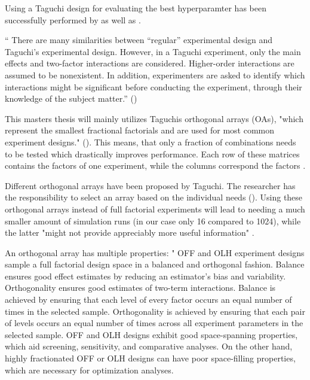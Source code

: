 
Using a Taguchi design for evaluating the best hyperparamter has been successfully performed by \cite{dao_maximising_2016} as well as \cite{assistant_professor_amity_university_jaipur_rajasthan_india_parameter_2019}. 

\enquote{ There are many similarities between “regular” experimental design and Taguchi's experimental design. However, in a Taguchi experiment, only the main effects and two-factor interactions are considered. Higher-order interactions are assumed to be nonexistent. In addition, experimenters are asked to identify which interactions might be significant before conducting the experiment, through their knowledge of the subject matter.} (\cite{yang_design_2009})

This masters thesis will mainly utilizes Taguchis orthogonal arrays (OAs), "which represent the smallest fractional factorials and are used for most common experiment designs." (\cite{roy_primer_1990}). This means, that only a fraction of combinations needs to be tested which drastically improves performance. Each row of these matrices contains the factors of one experiment, while the columns correspond the factors \cite{li_taguchi_2021}. 

Different orthogonal arrays have been proposed by Taguchi. The researcher has the responsibility to select an array based on the individual needs (\cite{li_taguchi_2021}).
Using these orthogonal arrays instead of full factorial experiments will lead to needing a much smaller amount of simulation runs (in our case only 16 compared to 1024), while the latter "might not provide appreciably more useful information" \cite{roy_primer_1990}.


An orthogonal array has multiple properties:
"
OFF and OLH experiment designs sample a full factorial design space in a balanced and orthogonal fashion. Balance ensures good effect estimates by reducing an estimator’s bias and variability. Orthogonality ensures good estimates of two-term interactions. Balance is achieved by ensuring that each level of every factor occurs an equal number of times in the selected sample. Orthogonality is achieved by ensuring that each pair of levels occurs an equal number of times across all experiment parameters in the selected sample. OFF and OLH designs exhibit good space-spanning properties, which aid screening, sensitivity, and comparative analyses. On the other hand, highly fractionated OFF or OLH designs can have poor space-filling properties, which are necessary for optimization analyses.

